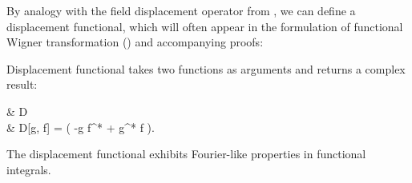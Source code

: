 By analogy with the field displacement operator from , we can define a displacement functional, which will often appear in the formulation of functional Wigner transformation () and accompanying proofs:

\begin{definition}
	Displacement functional takes two functions as arguments and returns a complex result:
	\begin{eqn*}
		& D \in {} \rightarrow {} \rightarrow {} \\
		& D[g, f] = \exp \int \upd\xvec \left(
			-g f^* + g^* f
		\right).
	\end{eqn*}
\end{definition}

The displacement functional exhibits Fourier-like properties in functional integrals.

